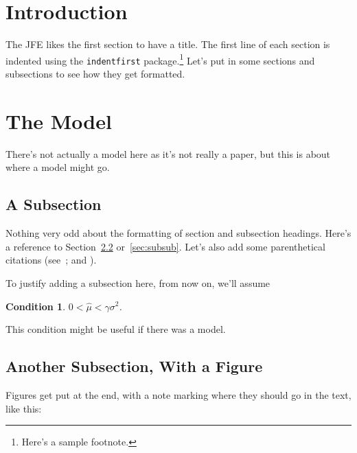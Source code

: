 \documentclass[12pt]{article}
\newtheorem{condition}{Condition}
\begin{document}



\thispagestyle{empty}

\clearpage

\onehalfspacing
\setcounter{footnote}{0}
\renewcommand{\thefootnote}{\arabic{footnote}}
\setcounter{page}{1}

\section{Introduction}

The JFE likes the first section to have a title. The first line of each section is indented using the \texttt{indentfirst} package.\footnote{Here's a sample footnote.} Let's put in some sections and subsections to see how they get formatted.

\section{The Model} \label{sec:Model}

There's not actually a model here as it's not really a paper, but this is about where a model might go. 

\subsection{A Subsection}

Nothing very odd about the formatting of section and subsection headings. Here's a reference to Section~\ref{sec:subsec} or~\ref{sec:subsub}. Let's also add some parenthetical citations (see~\citealp{Stanton:95,CarpenterStantonWallace:12}; and \citealp{Campbell:03}). 

To justify adding a subsection here, from now on, we'll assume
\begin{condition}\label{cond:rates}
$0 <  \hat{\mu} < \gamma\sigma^2$.
\vspace{3mm}
\end{condition}
This condition might be useful if there was a model. 

\subsection{Another Subsection, With a Figure}
\label{sec:subsec}

Figures get put at the end, with a note marking where they should go in the text, like this:
\end{document}
